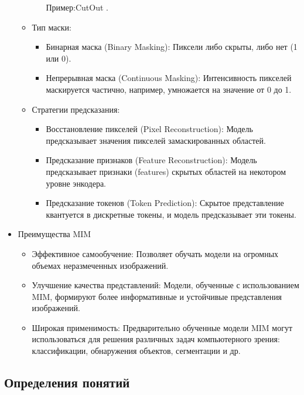 \begin{itemize}
\begin{itemize}
\begin{itemize}
                Пример:CutOut \cite{devries2017improved}.
            \end{itemize}
        \item Тип маски:
            \begin{itemize}
                \item Бинарная маска (Binary Masking): Пиксели либо скрыты, либо нет (1 или 0).
                \item Непрерывная маска (Continuous Masking): Интенсивность пикселей маскируется частично, например, умножается на значение от 0 до 1.
            \end{itemize}
        \item Стратегии предсказания:
            \begin{itemize}
                \item Восстановление пикселей (Pixel Reconstruction): Модель предсказывает значения пикселей замаскированных областей.
                \item Предсказание признаков (Feature Reconstruction): Модель предсказывает признаки (features) скрытых областей на некотором уровне энкодера. 
                \item Предсказание токенов (Token Prediction): Скрытое представление квантуется в дискретные токены, и модель предсказывает эти токены.
            \end{itemize}
    \end{itemize}

    \item{Преимущества MIM}
    \begin{itemize}
        \item Эффективное самообучение: Позволяет обучать модели на огромных объемах неразмеченных изображений.
        \item Улучшение качества представлений: Модели, обученные с использованием MIM, формируют более информативные и устойчивые представления изображений.
        \item Широкая применимость: Предварительно обученные модели MIM могут использоваться для решения различных задач компьютерного зрения: классификации, обнаружения объектов, сегментации и др.
    \end{itemize}
\end{itemize}
\subsection{Определения понятий}


